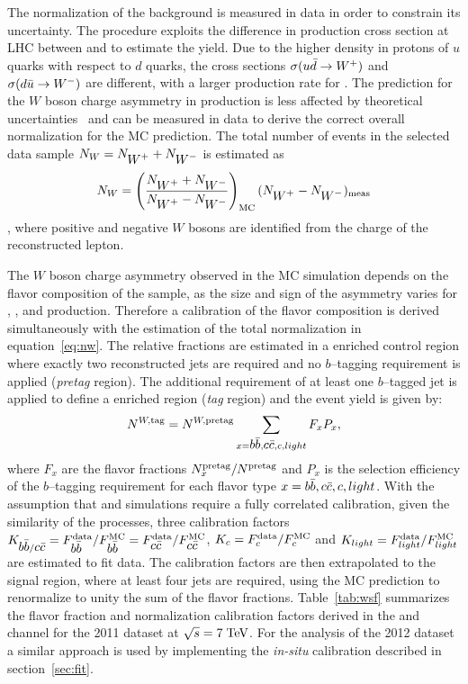The normalization of the \wjets{} background is measured in data in
order to constrain its uncertainty.
The procedure exploits the difference in production cross section at LHC
between \wpp{} and \wm{} to estimate the \wjets{} yield.
Due to the higher density in protons of $u$ quarks with respect to $d$ quarks,
the cross sections $\sigma(u\bar{d}\to \mbox{$W^+$}{})$ and $\sigma(d\bar{u}\to
\mbox{$W^-$}{})$ are different, with a larger production rate for \wpp{}. The
prediction for the $W$ boson charge asymmetry in \wjets{} production is less
affected by theoretical uncertainties~\cite{wasym} and can be measured
in data to derive the correct overall normalization for the MC prediction.
The total number of \wjets{} events in the selected data sample
$N_W=N_{\mbox{$W^+$}{}}+N_{\mbox{$W^-$}{}}$ is estimated as
\begin{equation}
N_W = \left(\frac{N_{\mbox{$W^+$}{}}+N_{\mbox{$W^-$}{}}}{N_{\mbox{$W^+$}{}}-N_{\mbox{$W^-$}{}}}\right )_{\rm MC}(N_{\mbox{$W^+$}{}}-N_{\mbox{$W^-$}{}})_{\rm meas}
\label{eq:nw}
\end{equation}
, where positive and negative $W$ bosons are identified from the
charge of the reconstructed lepton. 

The $W$ boson charge asymmetry observed in the MC simulation depends
on the flavor composition of the sample, as the size and sign of the
asymmetry varies for \wbb{}, \wcc{}, \wc{} and \wlight{} production.
Therefore a calibration of the flavor composition is derived
simultaneously with the estimation of the total normalization in
equation~\ref{eq:nw}.
The relative fractions are estimated in a \wjets{} enriched control
region where exactly two reconstructed jets are required and no
$b$--tagging requirement is applied ({\it pretag} region). 
The additional requirement of at least one $b$--tagged jet is applied
to define a \wbb{} enriched region ({\it tag} region) and the \wjets{}
event yield is given by: 
\begin{equation}
\label{eq:nwt}
N^{W,{\rm tag}} = 
N^{W,{\rm pretag}}
\sum_{x=\mbox{$b\bar{b}$}{}, \mbox{$c\bar{c}$}{}, c, light} F_xP_x,
\end{equation}
where $F_x$ are the flavor fractions $N^{\rm pretag}_x/N^{\rm pretag}$
and $P_x$ is the selection efficiency of the $b$--tagging requirement for each
flavor type $x = \mbox{$b\bar{b}$}{}, \mbox{$c\bar{c}$}{}, c, light$. 
 With the assumption that \wbb{} and \wcc{} simulations require a
 fully correlated calibration, given the similarity of the processes,
 three calibration factors $K_{\mbox{$b\bar{b}$}{}/\mbox{$c\bar{c}$}{}}=F^{\rm
   data}_{\mbox{$b\bar{b}$}{}}/F^{\rm MC}_{\mbox{$b\bar{b}$}{}}=F^{\rm
   data}_{\mbox{$c\bar{c}$}{}}/F^{\rm MC}_{\mbox{$c\bar{c}$}{}}$, $K_c=F^{\rm data}_{c}/F^{\rm MC}_{c}$ and $K_{light}=F^{\rm
  data}_{light}/F^{\rm MC}_{light}$ are estimated to fit data. The
calibration factors are then extrapolated to the signal region, where
at least four jets are required, using the MC prediction
to renormalize to unity the sum of the flavor fractions.
Table~\ref{tab:wsf} summarizes the flavor fraction and normalization
calibration factors derived in the \ejets{} and \mujets{} channel for
the 2011 dataset at $\sqrt{s} = 7 \; \mathrm{TeV}{}$.
For the analysis of the 2012 dataset a similar approach is used by
implementing the {\it in-situ} calibration described in section~\ref{sec:fit}.

